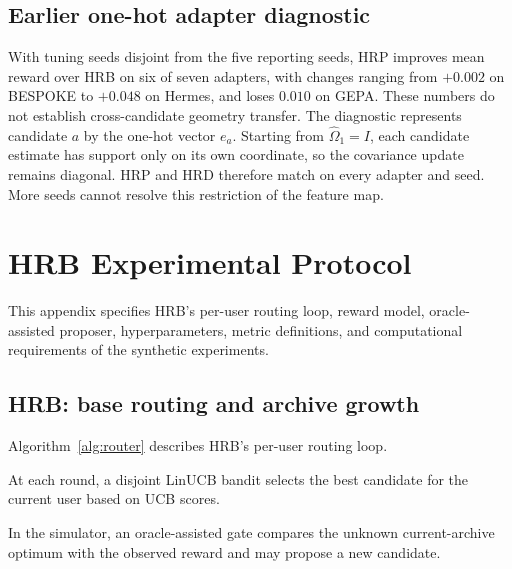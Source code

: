 \documentclass{article} %
\begin{document}
\subsection{Earlier one-hot adapter diagnostic}
With tuning seeds disjoint from the five reporting seeds, HRP improves mean reward over HRB on six of seven adapters, with changes ranging from $+0.002$ on BESPOKE to $+0.048$ on Hermes, and loses $0.010$ on GEPA. These numbers do not establish cross-candidate geometry transfer. The diagnostic represents candidate $a$ by the one-hot vector $e_a$. Starting from $\widehat{\Omega}_1=I$, each candidate estimate has support only on its own coordinate, so the covariance update remains diagonal. HRP and HRD therefore match on every adapter and seed. More seeds cannot resolve this restriction of the feature map.

\section{HRB Experimental Protocol}

\label{app:implementation}

This appendix specifies HRB's per-user routing loop, reward model,
oracle-assisted proposer, hyperparameters, metric definitions, and computational
requirements of the synthetic experiments.

\subsection{HRB: base routing and archive growth}

Algorithm~\ref{alg:router} describes HRB's per-user routing loop.

At each round, a disjoint LinUCB bandit selects the best candidate for the current user based on UCB scores.

In the simulator, an oracle-assisted gate compares the unknown current-archive optimum with the observed reward and may propose a new candidate.
\end{document}
